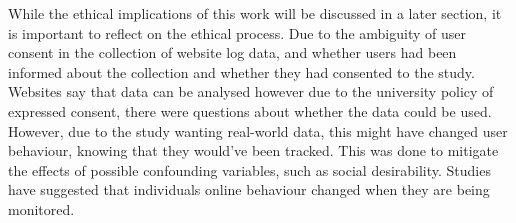 While the ethical implications of this work will be discussed in a later section, it is important to reflect on the ethical process. Due to the ambiguity of user consent in the collection of website log data, and whether users had been informed about the collection and whether they had consented to the study. Websites say that data can be analysed however due to the university policy of expressed consent, there were questions about whether the data could be used. However, due to the study wanting real-world data, this might have changed user behaviour, knowing that they would've been tracked. This was done to mitigate the effects of possible confounding variables, such as social desirability. Studies have suggested that individuals online behaviour changed when they are being monitored.